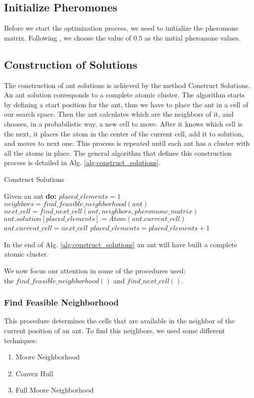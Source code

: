 	\subsection{Initialize Pheromones}
	Before we start the optimization process, we need to initialize the pheromone matrix. Following \cite{blum04}, we choose the value of $0.5$ as the initial pheromone values.

	\subsection{Construction of Solutions}
	The construction of ant solutions is achieved by the method Construct Solutions. An ant solution corresponds to a complete atomic cluster. The algorithm starts by defining a start position for the ant, thus we have to place the ant in a cell of our search space. Then the ant calculates which are the neighbors of it, and chooses, in a probabilistic way, a new cell to move. After it knows which cell is the next, it places the atom in the center of the current cell, add it to solution, and moves to next one. This process is repeated until each ant has a cluster with all the atoms in place. The general algorithm that defines this construction process is detailed in Alg. \ref{alg:construct_solutions}.
	
	\begin{algorithm}
		\caption{Construct Solutions}
		\label{alg:construct_solutions}
		\begin{algorithmic}
		\STATE Given an ant \bf{do}:
		\STATE $placed\_elements = 1$
			\STATE $neighbors = find\_feasible\_neighborhood(ant)$
			\STATE $next\_cell = find\_next\_cell(ant, neighbors, pheromone\_matrix)$
			\STATE $ant.solution[placed\_elements] = Atom(ant.current\_cell)$
			\STATE $ant.current\_cell = next\_cell$
			\STATE $placed\_elements = placed\_elements + 1$			
		\ENDWHILE
		\end{algorithmic}
	\end{algorithm}
	
	In the end of Alg. \ref{alg:construct_solutions} an ant will have built a complete atomic cluster.
	
	We now focus our attention in some of the procedures used:\\ the $find\_feasible\_neighborhood()$ and $find\_next\_cell()$. 
	
		\subsubsection*{Find Feasible Neighborhood}
		This procedure determines the cells that are available in the neighbor of the current position of an ant. To find this neighbors, we used some different techniques:
		\begin{enumerate}
			\item Moore Neighborhood
			\item Convex Hull
			\item Full Moore Neighborhood
		\end{enumerate}
	
